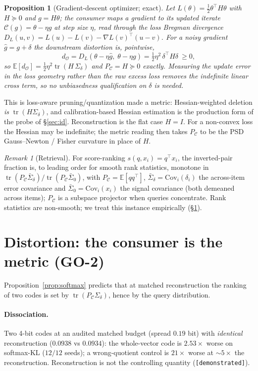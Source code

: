 \documentclass[11pt]{article}
\newtheorem{proposition}{Proposition}
\theoremstyle{definition}
\theoremstyle{remark}
\newtheorem*{remark}{Remark}
\newcommand{\PC}{P_{\mathcal{C}}}
\newcommand{\Sd}{\Sigma_{\delta}}
\newcommand{\tr}{\operatorname{tr}}
\newcommand{\dO}{d_{\mathcal{O}}}
\newcommand{\E}{\mathbb{E}}
\begin{document}
\begin{proposition}[Gradient-descent optimizer; exact]\label{prop:opt}
Let $L(\theta)=\tfrac12\theta^\top H\theta$ with $H\succeq0$ and $g=H\theta$; the
consumer maps a gradient to its updated iterate $\mathcal{C}(g)=\theta-\eta g$ at step
size $\eta$, read through the loss \emph{Bregman divergence}
$D_L(u,v)=L(u)-L(v)-\nabla L(v)^\top(u-v)$. For a noisy gradient $\hat g=g+\delta$ the
downstream distortion is, \emph{pointwise},
\[
\dO=D_L(\theta-\eta\hat g,\;\theta-\eta g)=\tfrac12\eta^2\,\delta^\top H\delta\ \ge0,
\]
so $\E[\dO]=\tfrac12\eta^2\tr(H\,\Sd)$ and $\PC=H\succeq0$ \emph{exactly}. Measuring the
update error in the loss geometry rather than the raw excess loss removes the
indefinite linear cross term, so no unbiasedness qualification on $\delta$ is needed.
\end{proposition}
\noindent This is loss-aware pruning/quantization made a metric: Hessian-weighted
deletion \cite{lecun1990,hassibi1993,dong2019hawq,frantar2023gptq} \emph{is}
$\tr(H\Sd)$, and calibration-based Hessian estimation is the production form of the
probe of \S\ref{sec:id}. Reconstruction is the flat case $H=I$. For a non-convex
loss the Hessian may be indefinite; the metric reading then takes $\PC$ to be the
PSD Gauss--Newton / Fisher curvature in place of $H$.

\begin{remark}[Retrieval]
For score-ranking $s(q,x_i)=q^\top x_i$, the inverted-pair fraction is, to leading
order for smooth rank statistics, monotone in
$\tr(\PC\bar\Sigma_\delta)/\tr(\PC\bar\Sigma_0)$, with $\PC=\E[qq^\top]$,
$\bar\Sigma_\delta=\mathrm{Cov}_i(\delta_i)$ the across-item error covariance and
$\bar\Sigma_0=\mathrm{Cov}_i(x_i)$ the signal covariance (both demeaned across items);
$\PC$ is a subspace projector when queries concentrate. Rank statistics are
non-smooth; we treat this instance empirically (\S\ref{sec:distortion}).
\end{remark}

\section{Distortion: the consumer is the metric (GO-2)}\label{sec:distortion}

Proposition~\ref{prop:softmax} predicts that at matched reconstruction the ranking of
two codes is set by $\tr(\PC\Sd)$, hence by the query distribution.

\paragraph{Dissociation.} Two 4-bit codes at an audited matched budget (spread
$0.19$ bit) with \emph{identical} reconstruction ($0.0938$ vs $0.0934$): the
whole-vector code is $2.53\times$ worse on softmax-KL ($12/12$ seeds); a
wrong-quotient control is $21\times$ worse at $\sim\!5\times$ the reconstruction.
Reconstruction is not the controlling quantity (\texttt{[demonstrated]}).
\end{document}
